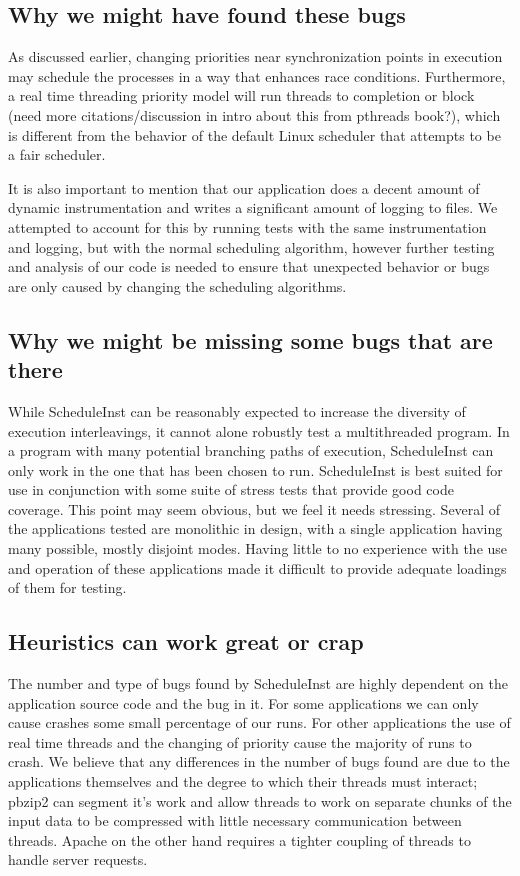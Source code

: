\documentclass[10pt,]{article} %
\begin{document}
\subsection{Why we might have found these bugs}

As discussed earlier, changing priorities near synchronization points in execution may schedule the processes in a way that enhances race conditions. Furthermore, a real time threading priority model will run threads to completion or block (need more citations/discussion in intro about this from pthreads book?), which is different from the behavior of the default Linux scheduler that attempts to be a fair scheduler. 

It is also important to mention that our application does a decent amount of dynamic instrumentation and writes a significant amount of logging to files. We attempted to account for this by running tests with the same instrumentation and logging, but with the normal scheduling algorithm, however further testing and analysis of our code is needed to ensure that unexpected behavior or bugs are only caused by changing the scheduling algorithms. 

\subsection{Why we might be missing some bugs that are there}

	While ScheduleInst can be reasonably expected to increase the diversity of execution interleavings, it cannot alone robustly test a multithreaded program.  In a program with many potential branching paths of execution, ScheduleInst can only work in the one that has been chosen to run.   ScheduleInst is best suited for use in conjunction with some suite of stress tests that provide good code coverage.  This point may seem obvious, but we feel it needs stressing.  Several of the applications tested are monolithic in design, with a single application having many possible, mostly disjoint modes.  Having little to no experience with the use and operation of these applications made it difficult to provide adequate loadings of them for testing. 


\subsection{Heuristics can work great or crap}
The number and type of bugs found by ScheduleInst are highly dependent on the application source code and the bug in it. For some applications we can only cause crashes some small percentage of our runs. For other applications the use of real time threads and the changing of priority cause the majority of runs to crash. We believe that any differences in the number of bugs found are due to the applications themselves and the degree to which their threads must interact; pbzip2 can segment it’s work and allow threads to work on separate chunks of the input data to be compressed with little necessary communication between threads.  Apache on the other hand requires a tighter coupling of threads to handle server requests.   
\end{document}
